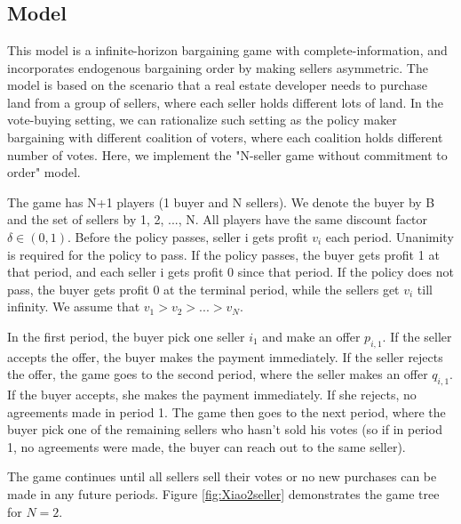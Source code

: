 \documentclass[ProjectGAZ]{subfiles}
\begin{document}
\section{\cite{Xiao}}\label{subsec:Xiao}

\subsection{Model}\label{subsec:Xiao-Model}
This model is a infinite-horizon bargaining game with complete-information, and incorporates endogenous bargaining order by making sellers asymmetric. The model is based on the scenario that a real estate developer needs to purchase land from a group of sellers, where each seller holds different lots of land. In the vote-buying setting, we can rationalize such setting as the policy maker bargaining with different coalition of voters, where each coalition holds different number of votes. Here, we implement the "N-seller game without commitment to order" model.

The game has N+1 players (1 buyer and N sellers). We denote the buyer by B and the set of sellers by {1, 2, ..., N}. All players have the same discount factor $\delta \in (0, 1)$. Before the policy passes, seller i gets profit $v_i$ each period. Unanimity is required for the policy to pass. If the policy passes, the buyer gets profit 1 at that period, and each seller i gets profit 0 since that period. If the policy does not pass, the buyer gets profit 0 at the terminal period, while the sellers get $v_i$ till infinity. We assume that $v_1 > v_2 > ... > v_N$.

In the first period, the buyer pick one seller $i_1$ and make an offer $p_{i,1}$. If the seller accepts the offer, the buyer makes the payment immediately. If the seller rejects the offer, the game goes to the second period, where the seller makes an offer $q_{i, 1}$. If the buyer accepts, she makes the payment immediately. If she rejects, no agreements made in period 1. The game then goes to the next period, where the buyer pick one of the remaining sellers who hasn't sold his votes (so if in period 1, no agreements were made, the buyer can reach out to the same seller).

The game continues until all sellers sell their votes or no new purchases can be made in any future periods. Figure \ref{fig:Xiao2seller} demonstrates the game tree for $N = 2$.

\providecommand{\figName}{Xiao2seller}
\providecommand{\figFile}{\figName}
\hypertarget{\figFile}{}

\end{document}
